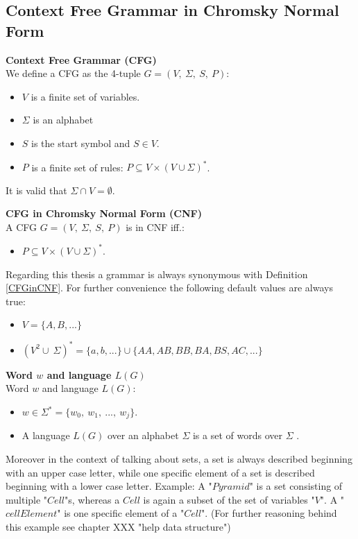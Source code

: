 \subsection{Context Free Grammar in Chromsky Normal Form}
\begin{DefGrey} \textbf{Context Free Grammar (CFG)}\\
	We define a CFG as the 4-tuple $G=(V,\ \Sigma,\ S,\ P)$:
	\begin{itemize}
		\item $V$ is a finite set of variables.
		\item $\Sigma$ is an alphabet
		\item $S$ is the start symbol and $S \in V$.
		\item $P$ is a finite set of rules: $P \subseteq V \times (V \cup \Sigma)^{*}$.
	\end{itemize}
	It is valid that $\Sigma \cap V =  \emptyset$.
\end{DefGrey}
\begin{DefGrey}\label{CFGinCNF} \textbf{CFG in Chromsky Normal Form (CNF)}\\
	A CFG $G=(V,\ \Sigma,\ S,\ P)$ is in CNF iff.:
	\begin{itemize}
		\item $P \subseteq V \times (V \cup \Sigma)^{*}$.
	\end{itemize}
\end{DefGrey}
\noindent Regarding this thesis a grammar is always synonymous with Definition \ref{CFGinCNF}. For further convenience the following default values are always true:
\begin{itemize}
	\item $V = \{A, B, ...\}$
	\item $(V^2 \cup\ \Sigma)^{*}=\{a, b, ...\} \cup \{AA, AB, BB, BA, BS, AC, ... \}$
\end{itemize}
\begin{DefGrey}\label{wordLanguage} \textbf{Word $w$ and language $L(G)$}\\
	Word $w$ and language $L(G)$:
	\begin{itemize}
		\item $w \in \Sigma^* = \{w_0,~w_1,~...,~w_j\}$.
		\item A language $L(G)$ over an alphabet $\Sigma$ is a set of words over $\Sigma$ .
	\end{itemize}
\end{DefGrey}
\noindent Moreover in the context of talking about sets, a set is always described beginning with an upper case letter, while one specific element of a set is described beginning with a lower case letter. Example: A "$Pyramid$" is a set consisting of multiple "$Cell$"s, whereas a $Cell$ is again a subset of the set of variables "$V$". A "$cellElement$" is one specific element of a "$Cell$". (For further reasoning behind this example see chapter XXX "help data structure") 
